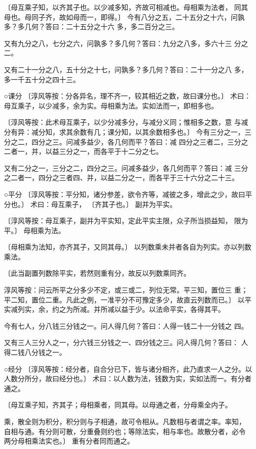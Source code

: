 \documentclass[12pt,UTF8]{ctexbook}
\begin{document}
〔母互乘子知，以齐其子也。以少减多知，齐故可相减也。母相乘为法者， 同其母也。母同子齐，故如母而一，即得。〕 今有八分之五，二十五分之十六，问孰多？多几何？答曰：二十五分之十六 多，多二百分之三。

又有九分之八，七分之六，问孰多？多几何？答曰：九分之八多，多六十三 分之二。

又有二十一分之八，五十分之十七，问孰多？多几何？答曰：二十一分之八 多，多一千五十分之四十三。

○课分 〔淳风等按：分各异名，理不齐一，较其相近之数，故曰课分也。〕 术曰：母互乘子，以少减多，余为实。母相乘为法。实如法而一，即相多也。

〔淳风等按：此术母互乘子，以少分减多分，与减分义同；惟相多之数，意 与减分有异：减分知，求其余数有几；课分知，以其余数相多也。〕 今有三分之一，三分之二，四分之三。问减多益少，各几何而平？答曰：减 四分之三者二，三分之二者一，并，以益三分之一，而各平于十二分之七。

又有二分之一，三分之二，四分之三。问减多益少，各几何而平？答曰：减 三分之二者一，四分之三者四、并，以益二分之一，而各平于三十六分之二十三。

○平分 〔淳风等按：平分知，诸分参差，欲令齐等，减彼之多，增此之少，故曰平 分也。〕 术曰：母互乘子， 〔齐其子也。〕 副并为平实。

〔淳风等按：母互乘子，副并为平实知，定此平实主限，众子所当损益知， 限为平。〕 母相乘为法。

〔母相乘为法知，亦齐其子，又同其母。〕 以列数乘未并者各自为列实。亦以列数乘法。

〔此当副置列数除平实，若然则重有分，故反以列数乘同齐。

淳风等按：问云所平之分多少不定，或三或二，列位无常。平三知，置位三 重；平二知，置位二重。凡此之例，一准平分不可豫定多少，故直云列数而已。〕 以平实减列实，余，约之为所减。并所减以益于少。以法命平实，各得其平。

今有七人，分八钱三分钱之一。问人得几何？答曰：人得一钱二十一分钱之 四。

又有三人三分人之一，分六钱三分钱之一、四分钱之三。问人得几何？答曰： 人得二钱八分钱之一。

○经分 〔淳风等按：经分者，自合分已下，皆与诸分相齐，此乃直求一人之分。以 人数分所分，故曰经分也。〕 术曰：以人数为法，钱数为实，实如法而一。有分者通之。

〔母互乘子知，齐其子；母相乘者，同其母。以母通之者，分母乘全内子。

乘，散全则为积分，积分则与子相通，故可令相从。凡数相与者谓之率。率知， 自相与通。有分则可散，分重叠则约也；等除法实，相与率也。故散分者，必令 两分母相乘法实也。〕 重有分者同而通之。
\end{document}
